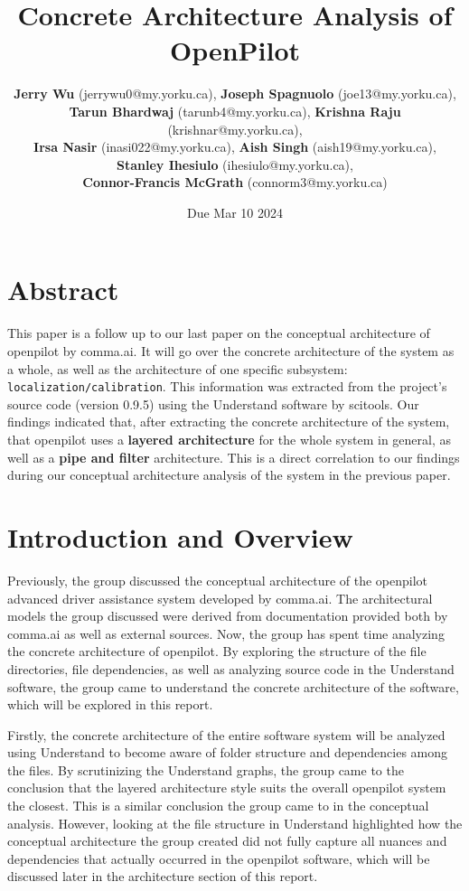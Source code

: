 \documentclass[12pt]{article}
\title{Concrete Architecture Analysis of OpenPilot}
\author{
    \textbf{Jerry Wu} (jerrywu0@my.yorku.ca), \textbf{Joseph Spagnuolo} (joe13@my.yorku.ca),\\ \textbf{Tarun Bhardwaj} (tarunb4@my.yorku.ca),
    \textbf{Krishna Raju} (krishnar@my.yorku.ca),\\ \textbf{Irsa Nasir} (inasi022@my.yorku.ca),
    \textbf{Aish Singh} (aish19@my.yorku.ca),\\ \textbf{Stanley Ihesiulo} (ihesiulo@my.yorku.ca),\\
    \textbf{Connor-Francis McGrath} (connorm3@my.yorku.ca)
}
\date{Due Mar 10 2024}
\begin{document}
\maketitle
\tableofcontents

\newpage
\section*{Abstract}
This paper is a follow up to our last paper on the conceptual architecture of openpilot by comma.ai. It will go over the concrete architecture of the system as a whole, as well as the architecture of one specific subsystem: \texttt{localization/calibration}. This information was extracted from the project's source code (version 0.9.5) using the Understand software by scitools. Our findings indicated that, after extracting the concrete architecture of the system, that openpilot uses a \textbf{layered architecture} for the whole system in general, as well as a \textbf{pipe and filter} architecture. This is a direct correlation to our findings during our conceptual architecture analysis of the system in the previous paper.

\section{Introduction and Overview}
Previously, the group discussed the conceptual architecture of the openpilot advanced driver assistance system developed by comma.ai. The architectural models the group discussed were derived from documentation provided both by comma.ai as well as external sources. Now, the group has spent time analyzing the concrete architecture of openpilot. By exploring the structure of the file directories, file dependencies, as well as analyzing source code in the Understand software, the group came to understand the concrete architecture of the software, which will be explored in this report.

Firstly, the concrete architecture of the entire software system will be analyzed using Understand to become aware of folder structure and dependencies among the files. By scrutinizing the Understand graphs, the group came to the conclusion that the layered architecture style suits the overall openpilot system the closest. This is a similar conclusion the group came to in the conceptual analysis. However, looking at the file structure in Understand highlighted how the conceptual architecture the group created did not fully capture all nuances and dependencies that actually occurred in the openpilot software, which will be discussed later in the architecture section of this report.
\end{document}
